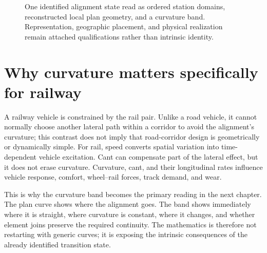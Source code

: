 \begin{figure}[htbp]
  \centering
  \resizebox{\textwidth}{!}{}
  \caption{One identified alignment state read as ordered station domains,
  reconstructed local plan geometry, and a curvature band. Representation,
  geographic placement, and physical realization remain attached
  qualifications rather than intrinsic identity.}
  \label{fig:alignment-object-stationing-curvature}
\end{figure}

\section*{Why curvature matters specifically for railway}

A railway vehicle is constrained by the rail pair. Unlike a road vehicle, it
cannot normally choose another lateral path within a corridor to avoid the
alignment's curvature; this contrast does not imply that road-corridor design
is geometrically or dynamically simple. For rail, speed converts spatial
variation into time-dependent vehicle excitation. Cant can compensate part of
the lateral effect, but it does not erase curvature. Curvature, cant, and their
longitudinal rates influence vehicle response, comfort, wheel--rail forces,
track demand, and wear.

This is why the curvature band becomes the primary reading in the next
chapter. The plan curve shows where the alignment goes. The band shows
immediately where it is straight, where curvature is constant, where it
changes, and whether element joins preserve the required continuity. The
mathematics is therefore not restarting with generic curves; it is exposing
the intrinsic consequences of the already identified transition state.
